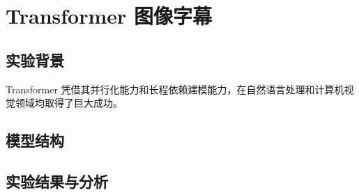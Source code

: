 \chapter{Transformer 图像字幕}
\label{chap:transformer_captioning}

\section{实验背景}
Transformer 凭借其并行化能力和长程依赖建模能力，在自然语言处理和计算机视觉领域均取得了巨大成功。

\section{模型结构}

\section{实验结果与分析}
